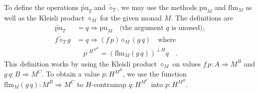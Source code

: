 To define the operations $\tilde{\text{pu}}_{T}$ and $\tilde{\diamond}_{T}$,
we may use the methods $\text{pu}_{M}$ and $\text{flm}_{M}$ as well
as the Kleisli product $\diamond_{M}$ for the given monad $M$. The
definitions are
\begin{align*}
\tilde{\text{pu}}_{T} & =q\Rightarrow\text{pu}_{M}\quad\text{(the argument }q\text{ is unused)},\\
f\tilde{\diamond}_{T}g & =q\Rightarrow\left(f\,p\right)\diamond_{M}\left(g\,q\right)\quad\text{where}\\
 & \quad p^{:H^{M^{B}}}=\left(\text{flm}_{M}\left(g\,q\right)\right)^{\downarrow H}q\quad.
\end{align*}
This definition works by using the Kleisli product $\diamond_{M}$
on values $f\,p:A\Rightarrow M^{B}$ and $g\,q:B\Rightarrow M^{C}$.
To obtain a value $p:H^{M^{B}}$, we use the function $\text{flm}_{M}\left(g\,q\right):M^{B}\Rightarrow M^{C}$
to $H$-contramap $q:H^{M^{C}}$ into $p:H^{M^{B}}$.

